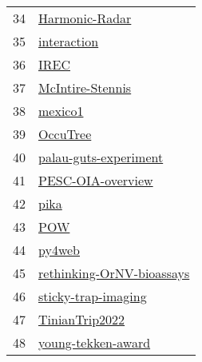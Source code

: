 \begin{longtable}{rl}
34 &                                             \href{https://github.com/aubreymoore/Harmonic-Radar}{Harmonic-Radar} \\
35 &                                                   \href{https://github.com/aubreymoore/interaction}{interaction} \\
36 &                                                                 \href{https://github.com/aubreymoore/IREC}{IREC} \\
37 &                                         \href{https://github.com/aubreymoore/McIntire-Stennis}{McIntire-Stennis} \\
38 &                                                           \href{https://github.com/aubreymoore/mexico1}{mexico1} \\
39 &                                                         \href{https://github.com/aubreymoore/OccuTree}{OccuTree} \\
40 &                               \href{https://github.com/aubreymoore/palau-guts-experiment}{palau-guts-experiment} \\
41 &                                       \href{https://github.com/aubreymoore/PESC-OIA-overview}{PESC-OIA-overview} \\
42 &                                                                 \href{https://github.com/aubreymoore/pika}{pika} \\
43 &                                                                   \href{https://github.com/aubreymoore/POW}{POW} \\
44 &                                                             \href{https://github.com/aubreymoore/py4web}{py4web} \\
45 &                       \href{https://github.com/aubreymoore/rethinking-OrNV-bioassays}{rethinking-OrNV-bioassays} \\
46 &                                   \href{https://github.com/aubreymoore/sticky-trap-imaging}{sticky-trap-imaging} \\
47 &                                             \href{https://github.com/aubreymoore/TinianTrip2022}{TinianTrip2022} \\
48 &                                     \href{https://github.com/aubreymoore/young-tekken-award}{young-tekken-award} \\
\end{longtable}

